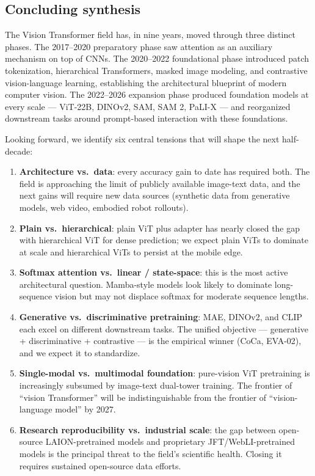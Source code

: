 \documentclass{article}
\begin{document}
\subsection{Concluding synthesis}\label{concluding-synthesis}

The Vision Transformer field has, in nine years, moved through three distinct phases. The 2017--2020 preparatory phase saw attention as an auxiliary mechanism on top of CNNs. The 2020--2022 foundational phase introduced patch tokenization, hierarchical Transformers, masked image modeling, and contrastive vision-language learning, establishing the architectural blueprint of modern computer vision. The 2022--2026 expansion phase produced foundation models at every scale --- ViT-22B, DINOv2, SAM, SAM 2, PaLI-X --- and reorganized downstream tasks around prompt-based interaction with these foundations.

Looking forward, we identify six central tensions that will shape the next half-decade:

\begin{enumerate}
\def\labelenumi{\arabic{enumi}.}
\item
  \textbf{Architecture vs.~data}: every accuracy gain to date has required both. The field is approaching the limit of publicly available image-text data, and the next gains will require new data sources (synthetic data from generative models, web video, embodied robot rollouts).
\item
  \textbf{Plain vs.~hierarchical}: plain ViT plus adapter has nearly closed the gap with hierarchical ViT for dense prediction; we expect plain ViTs to dominate at scale and hierarchical ViTs to persist at the mobile edge.
\item
  \textbf{Softmax attention vs.~linear / state-space}: this is the most active architectural question. Mamba-style models look likely to dominate long-sequence vision but may not displace softmax for moderate sequence lengths.
\item
  \textbf{Generative vs.~discriminative pretraining}: MAE, DINOv2, and CLIP each excel on different downstream tasks. The unified objective --- generative + discriminative + contrastive --- is the empirical winner (CoCa, EVA-02), and we expect it to standardize.
\item
  \textbf{Single-modal vs.~multimodal foundation}: pure-vision ViT pretraining is increasingly subsumed by image-text dual-tower training. The frontier of ``vision Transformer'' will be indistinguishable from the frontier of ``vision-language model'' by 2027.
\item
  \textbf{Research reproducibility vs.~industrial scale}: the gap between open-source LAION-pretrained models and proprietary JFT/WebLI-pretrained models is the principal threat to the field's scientific health. Closing it requires sustained open-source data efforts.
\end{enumerate}
\end{document}
